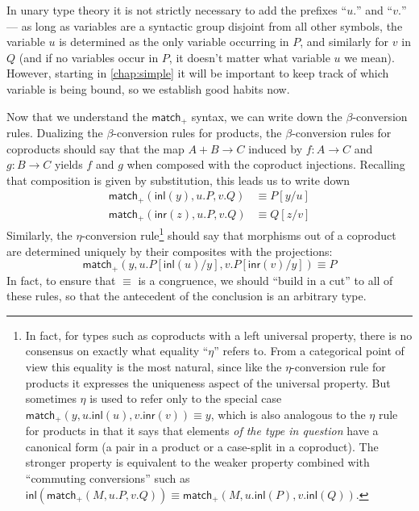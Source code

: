 \documentclass{book}
\def\inl{\mathsf{inl}}
\def\inr{\mathsf{inr}}
\def\case{\mathsf{match}_+}
\begin{document}
\begin{rmk}
  In unary type theory it is not strictly necessary to add the prefixes ``$u.$'' and ``$v.$'' --- as long as variables are a syntactic group disjoint from all other symbols, the variable $u$ is determined as the only variable occurring in $P$, and similarly for $v$ in $Q$ (and if no variables occur in $P$, it doesn't matter what variable $u$ we mean).
  However, starting in \cref{chap:simple} it will be important to keep track of which variable is being bound, so we establish good habits now.
\end{rmk}

Now that we understand the $\case$ syntax, we can write down the $\beta$-conversion rules.
Dualizing the $\beta$-conversion rules for products, the $\beta$-conversion rules for coproducts should say that the map $A+B\to C$ induced by $f:A\to C$ and $g:B\to C$ yields $f$ and $g$ when composed with the coproduct injections.
Recalling that composition is given by substitution, this leads us to write down
\begin{align*}
  \case(\inl(y),u.P,v.Q) &\equiv P[y/u]\\
  \case(\inr(z),u.P,v.Q) &\equiv Q[z/v]
\end{align*}
Similarly, the $\eta$-conversion rule\footnote{In fact, for types such as coproducts with a left universal property, there is no consensus on exactly what equality ``$\eta$'' refers to.\label{fn:weak-eta}
  From a categorical point of view this equality is the most natural, since like the $\eta$-conversion rule for products it expresses the uniqueness aspect of the universal property.
  But sometimes $\eta$ is used to refer only to the special case $\case(y,u.\inl(u),v.\inr(v))\equiv y$, which is also analogous to the $\eta$ rule for products in that it says that elements \emph{of the type in question} have a canonical form (a pair in a product or a case-split in a coproduct).
  The stronger property is equivalent to the weaker property combined with ``commuting conversions'' such as $\inl(\case(M,u.P,v.Q)) \equiv \case(M,u.\inl(P),v.\inl(Q))$.%
} should say that morphisms out of a coproduct are determined uniquely by their composites with the projections:
\begin{equation}
  \case(y,u.P[\inl(u)/y],v.P[\inr(v)/y]) \equiv P\label{eq:catcoprod-eta}
\end{equation}
In fact, to ensure that $\equiv$ is a congruence, we should ``build in a cut'' to all of these rules, so that the antecedent of the conclusion is an arbitrary type.
\end{document}
